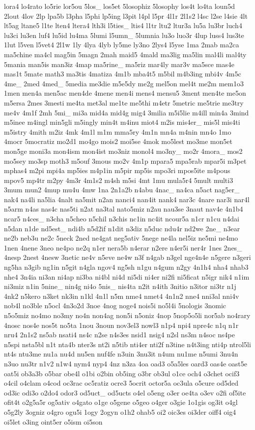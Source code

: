 {lora4 lo4rato lo5rie lor5ou 5los\-\_\- los5et 5losophiz 5losophy los4t lo4ta loun5d 2lout 4lov 2lp lpa5b l3pha l5phi lp5ing l3pit l4pl l5pr 4l1r 2l1s2 l4sc l2se l4sie 4lt lt5ag ltane5 l1te lten4 ltera4 lth3i l5ties\-\_\- ltis4 l1tr ltu2 ltur3a lu5a lu3br luch4 lu3ci lu3en luf4 lu5id lu4ma 5lumi l5umn\-\_\- 5lumnia lu3o luo3r 4lup luss4 lus3te 1lut l5ven l5vet4 2l1w 1ly 4lya 4lyb ly5me ly3no 2lys4 l5yse 1ma 2mab ma2ca ma5chine ma4cl mag5in 5magn 2mah maid5 4mald ma3lig ma5lin mal4li mal4ty 5mania man5is man3iz 4map ma5rine\-\_\- ma5riz mar4ly mar3v ma5sce mas4e mas1t 5mate math3 ma3tis 4matiza 4m1b mba4t5 m5bil m4b3ing mbi4v 4m5c 4me\-\_\- 2med 4med\-\_\- 5media me3die m5e5dy me2g mel5on mel4t me2m mem1o3 1men men4a men5ac men4de 4mene men4i mens4 mensu5 3ment men4te me5on m5ersa 2mes 3mesti me4ta met3al me1te me5thi m4etr 5metric me5trie me3try me4v 4m1f 2mh 5mi\-\_\- mi3a mid4a mid4g mig4 3milia m5i5lie m4ill min4a 3mind m5inee m4ingl min5gli m5ingly min4t m4inu miot4 m2is mis4er\-\_\- mis5l mis4ti m5istry 4mith m2iz 4mk 4m1l m1m mma5ry 4m1n mn4a m4nin mn4o 1mo 4mocr 5mocratiz mo2d1 mo4go mois2 moi5se 4mok mo5lest mo3me mon5et mon5ge moni3a mon4ism mon4ist mo3niz monol4 mo3ny\-\_\- mo2r 4mora\-\_\- mos2 mo5sey mo3sp moth3 m5ouf 3mous mo2v 4m1p mpara5 mpa5rab mpar5i m3pet mphas4 m2pi mpi4a mp5ies m4p1in m5pir mp5is mpo3ri mpos5ite m4pous mpov5 mp4tr m2py 4m3r 4m1s2 m4sh m5si 4mt 1mu mula5r4 5mult multi3 3mum mun2 4mup mu4u 4mw 1na 2n1a2b n4abu 4nac\-\_\- na4ca n5act nag5er\-\_\- nak4 na4li na5lia 4nalt na5mit n2an nanci4 nan4it nank4 nar3c 4nare nar3i nar4l n5arm n4as nas4c nas5ti n2at na3tal nato5miz n2au nau3se 3naut nav4e 4n1b4 ncar5 n4ces\-\_\- n3cha n5cheo n5chil n3chis nc1in nc4it ncour5a n1cr n1cu n4dai n5dan n1de nd5est\-\_\- ndi4b n5d2if n1dit n3diz n5duc ndu4r nd2we 2ne\-\_\- n3ear ne2b neb3u ne2c 5neck 2ned ne4gat neg5ativ 5nege ne4la nel5iz ne5mi ne4mo 1nen 4nene 3neo ne4po ne2q n1er nera5b n4erar n2ere n4er5i ner4r 1nes 2nes\-\_\- 4nesp 2nest 4nesw 3netic ne4v n5eve ne4w n3f n4gab n3gel nge4n4e n5gere n3geri ng5ha n3gib ng1in n5git n4gla ngov4 ng5sh n1gu n4gum n2gy 4n1h4 nha4 nhab3 nhe4 3n4ia ni3an ni4ap ni3ba ni4bl ni4d ni5di ni4er ni2fi ni5ficat n5igr nik4 n1im ni3miz n1in 5nine\-\_\- nin4g ni4o 5nis\-\_\- nis4ta n2it n4ith 3nitio n3itor ni3tr n1j 4nk2 n5kero n3ket nk3in n1kl 4n1l n5m nme4 nmet4 4n1n2 nne4 nni3al nni4v nob4l no3ble n5ocl 4n3o2d 3noe 4nog noge4 nois5i no5l4i 5nologis 3nomic n5o5miz no4mo no3my no4n non4ag non5i n5oniz 4nop 5nop5o5li nor5ab no4rary 4nosc nos4e nos5t no5ta 1nou 3noun nov3el3 nowl3 n1p4 npi4 npre4c n1q n1r nru4 2n1s2 ns5ab nsati4 ns4c n2se n4s3es nsid1 nsig4 n2sl ns3m n4soc ns4pe n5spi nsta5bl n1t nta4b nter3s nt2i n5tib nti4er nti2f n3tine n4t3ing nti4p ntrol5li nt4s ntu3me nu1a nu4d nu5en nuf4fe n3uin 3nu3it n4um nu1me n5umi 3nu4n n3uo nu3tr n1v2 n1w4 nym4 nyp4 4nz n3za 4oa oad3 o5a5les oard3 oas4e oast5e oat5i ob3a3b o5bar obe4l o1bi o2bin ob5ing o3br ob3ul o1ce och4 o3chet ocif3 o4cil o4clam o4cod oc3rac oc5ratiz ocre3 5ocrit octor5a oc3ula o5cure od5ded od3ic odi3o o2do4 odor3 od5uct\-\_\- od5ucts o4el o5eng o3er oe4ta o3ev o2fi of5ite ofit4t o2g5a5r og5ativ o4gato o1ge o5gene o5geo o4ger o3gie 1o1gis og3it o4gl o5g2ly 3ogniz o4gro ogu5i 1ogy 2ogyn o1h2 ohab5 oi2 oic3es oi3der oiff4 oig4 oi5let o3ing oint5er o5ism oi5son }
